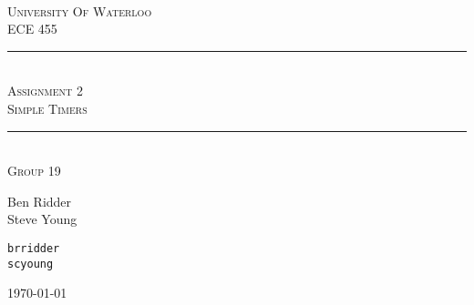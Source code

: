 \begin{titlepage}
\begin{center}
\vfill
\hfill
\\[2cm]
\textsc{\LARGE University Of Waterloo}
\\[1cm]
\textsc{\LARGE ECE 455}
\\[2cm]

\hrule
\hfill
\\[0.5cm]
\textsc{\huge Assignment 2}
\\[0.5cm]
\textsc{\huge Simple Timers}
\\[0.5cm]
\hrule
\hfill
\\[1cm]
\textsc{\LARGE Group 19} \\[0.4cm]

\begin{minipage}{0.4\textwidth}
\begin{flushleft} \large
Ben Ridder \\
Steve Young \\
\end{flushleft}
\end{minipage}
\begin{minipage}{0.4\textwidth}
\begin{flushright} \large
\texttt{brridder} \\
\texttt{scyoung} \\
\end{flushright}
\end{minipage}


\vfill

{\large \today}
\end{center}
\end{titlepage}
